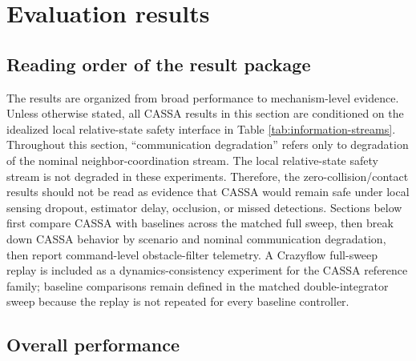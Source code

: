 \documentclass[11pt]{article}
\begin{document}
\section{Evaluation results}

\subsection{Reading order of the result package}

The results are organized from broad performance to mechanism-level evidence. Unless otherwise stated, all CASSA results in this section are conditioned on the idealized local relative-state safety interface in Table \ref{tab:information-streams}. Throughout this section, ``communication degradation'' refers only to degradation of the nominal neighbor-coordination stream. The local relative-state safety stream is not degraded in these experiments. Therefore, the zero-collision/contact results should not be read as evidence that CASSA would remain safe under local sensing dropout, estimator delay, occlusion, or missed detections. Sections below first compare CASSA with baselines across the matched full sweep, then break down CASSA behavior by scenario and nominal communication degradation, then report command-level obstacle-filter telemetry. A Crazyflow full-sweep replay is included as a dynamics-consistency experiment for the CASSA reference family; baseline comparisons remain defined in the matched double-integrator sweep because the replay is not repeated for every baseline controller.

\subsection{Overall performance}
\end{document}
